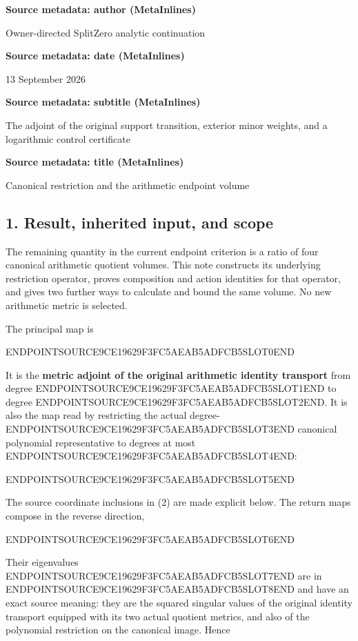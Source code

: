 \textbf{Source metadata: author (MetaInlines)}

Owner-directed SplitZero analytic continuation

\textbf{Source metadata: date (MetaInlines)}

13 September 2026

\textbf{Source metadata: subtitle (MetaInlines)}

The adjoint of the original support transition, exterior minor weights, and a logarithmic control certificate

\textbf{Source metadata: title (MetaInlines)}

Canonical restriction and the arithmetic endpoint volume

\subsection{1. Result, inherited input, and scope}\label{endpoint-restriction_original--result-inherited-input-and-scope}

The remaining quantity in the current endpoint criterion is a ratio of four canonical arithmetic quotient volumes. This note constructs its underlying restriction operator, proves composition and action identities for that operator, and gives two further ways to calculate and bound the same volume. No new arithmetic metric is selected.

The principal map is

ENDPOINTSOURCE9CE19629F3FC5AEAB5ADFCB5SLOT0END

It is the \textbf{metric adjoint of the original arithmetic identity transport} from degree ENDPOINTSOURCE9CE19629F3FC5AEAB5ADFCB5SLOT1END to degree ENDPOINTSOURCE9CE19629F3FC5AEAB5ADFCB5SLOT2END. It is also the map read by restricting the actual degree-ENDPOINTSOURCE9CE19629F3FC5AEAB5ADFCB5SLOT3END canonical polynomial representative to degrees at most ENDPOINTSOURCE9CE19629F3FC5AEAB5ADFCB5SLOT4END:

ENDPOINTSOURCE9CE19629F3FC5AEAB5ADFCB5SLOT5END

The source coordinate inclusions in (2) are made explicit below. The return maps compose in the reverse direction,

ENDPOINTSOURCE9CE19629F3FC5AEAB5ADFCB5SLOT6END

Their eigenvalues ENDPOINTSOURCE9CE19629F3FC5AEAB5ADFCB5SLOT7END are in ENDPOINTSOURCE9CE19629F3FC5AEAB5ADFCB5SLOT8END and have an exact source meaning: they are the squared singular values of the original identity transport equipped with its two actual quotient metrics, and also of the polynomial restriction on the canonical image. Hence


